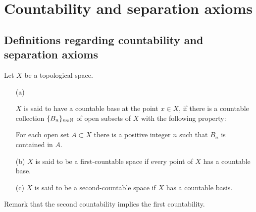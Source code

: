 \section{Countability and separation axioms}

\subsection{Definitions regarding countability and separation axioms}
\begin{defi}
    Let $X$ be a topological space.
    \begin{enumerate}
        \item[(a)]
        {
            $X$ is said to have a countable base at the point $x\in X$, if there is a countable collection $\{B_n\}_{n\in{\mathbb{N}}}$ of open subsets of $X$ with the following property:
            \begin{center}
                For each open set $A\subset X$ there is a positive integer $n$ such that $B_n$ is contained in $A$.
            \end{center}
        }
        \item[(b)]
        {
            $X$ is said to be a first-countable space if every point of $X$ has a countable base.
        }
        \item[(c)]
        {
            $X$ is said to be a second-countable space if $X$ has a countable basis.
        }
    \end{enumerate}
    Remark that the second countability implies the first countability.
\end{defi}

